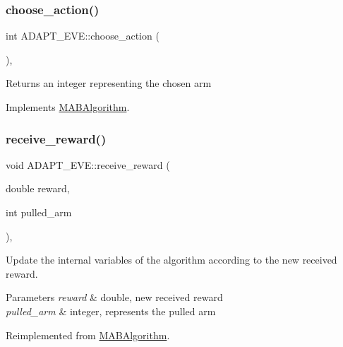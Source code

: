 \subsubsection{\texorpdfstring{choose\+\_\+action()}{choose\_action()}}
{\footnotesize\ttfamily int A\+D\+A\+P\+T\+\_\+\+E\+V\+E\+::choose\+\_\+action (\begin{DoxyParamCaption}{ }\end{DoxyParamCaption})\hspace{0.3cm}{\ttfamily [override]}, {\ttfamily [virtual]}}

\begin{DoxyReturn}{Returns}
an integer representing the chosen arm 
\end{DoxyReturn}


Implements \mbox{\hyperlink{class_m_a_b_algorithm_afb48f01df0e1860d19759f6e20335007}{M\+A\+B\+Algorithm}}.

\mbox{\label{class_a_d_a_p_t___e_v_e_ab626b3d8e8f27200e35a0fc3c80f9539}} 
\subsubsection{\texorpdfstring{receive\+\_\+reward()}{receive\_reward()}}
{\footnotesize\ttfamily void A\+D\+A\+P\+T\+\_\+\+E\+V\+E\+::receive\+\_\+reward (\begin{DoxyParamCaption}\item[{double}]{reward,  }\item[{int}]{pulled\+\_\+arm }\end{DoxyParamCaption})\hspace{0.3cm}{\ttfamily [override]}, {\ttfamily [virtual]}}



Update the internal variables of the algorithm according to the new received reward. 


\begin{DoxyParams}{Parameters}
{\em reward} & double, new received reward \\
\hline
{\em pulled\+\_\+arm} & integer, represents the pulled arm \\
\hline
\end{DoxyParams}


Reimplemented from \mbox{\hyperlink{class_m_a_b_algorithm_aa584b3d6b86fa050e3389be9781b5782}{M\+A\+B\+Algorithm}}.

